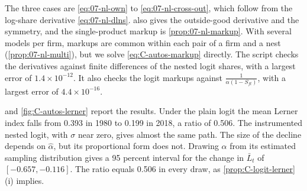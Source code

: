 The three cases are \eqref{eq:07-nl-own} to \eqref{eq:07-nl-cross-out}, which follow from the log-share derivative
\eqref{eq:07-nl-dlns}.  also gives the outside-good derivative and the symmetry, and
the single-product markup is \cref{prop:07-nl-markup}. With several models per firm, markups are common within each
pair of a firm and a nest (\cref{prop:07-nl-multi}), but we solve \eqref{eq:C-autos-markup} directly. The script checks the
derivatives against finite differences of the nested logit shares, with a largest error of $1.4\times10^{-12}$. It also
checks the logit markups against $\frac{1}{\alpha(1 - S_{ft})}$, with a largest error of $4.4\times10^{-16}$.

 and \cref{fig:C-autos-lerner} report the results. Under the plain logit the mean Lerner index falls
from 0.393 in 1980 to 0.199 in 2018, a ratio of 0.506. The instrumented nested logit, with $\sigma$ near zero, gives
almost the same path. The size of the decline depends on $\hat\alpha$, but its proportional form does not. Drawing $\alpha$ from its estimated
sampling distribution gives a 95 percent interval for the change in $\bar L_t$ of $[-0.657, -0.116]$. The ratio equals
0.506 in every draw, as \cref{prop:C-logit-lerner}(i) implies.

